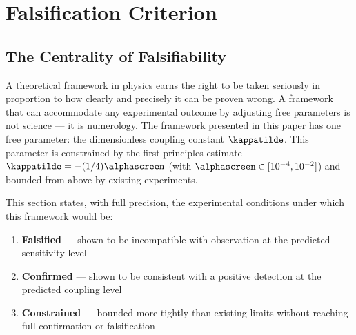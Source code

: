 %

\section{Falsification Criterion}
\label{sec:falsification}

\subsection{The Centrality of Falsifiability}
\label{subsec:falsifiability_centrality}

A theoretical framework in physics earns the right to be taken seriously
in proportion to how clearly and precisely it can be proven wrong. A
framework that can accommodate any experimental outcome by adjusting
free parameters is not science --- it is numerology. The framework
presented in this paper has one free parameter: the dimensionless
coupling constant $\kappatilde$. This parameter is constrained by the
first-principles estimate $\kappatilde = -(1/4)\alphascreen$ (with
$\alphascreen\in[10^{-4},10^{-2}]$) and bounded from above by existing
experiments.

This section states, with full precision, the experimental conditions
under which this framework would be:
\begin{enumerate}
    \item \textbf{Falsified} --- shown to be incompatible with observation
    at the predicted sensitivity level
    \item \textbf{Confirmed} --- shown to be consistent with a positive
    detection at the predicted coupling level
    \item \textbf{Constrained} --- bounded more tightly than existing
    limits without reaching full confirmation or falsification
\end{enumerate}

